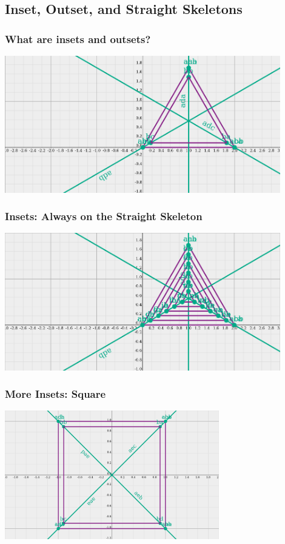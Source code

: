\documentclass[hyperref={pdfpagemode=FullScreen},aspectratio=169]{beamer}
\begin{document}
\subsection{Inset, Outset, and Straight Skeletons}

\begin{frame}
  \frametitle{What are insets and outsets?}
  \includegraphics[width=0.9\textwidth, center]{triangle-one_inset.png}
\end{frame}

\begin{frame}
  \frametitle{Insets: Always on the Straight Skeleton}
    \includegraphics[width=0.9\textwidth, center]{triangle-all_insets.png}
\end{frame}

\begin{frame}
  \frametitle{More Insets: Square}
    \includegraphics[width=0.7\textwidth, center]{square-Straight_Skeleton_and_Inset.png}
\end{frame}
\end{document}
